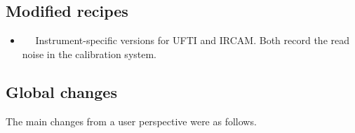 \documentclass[twoside,11pt,nolof]{starlink}
\begin{document}
\subsection{Modified recipes}

\begin{itemize}
    \item {}~~
       Instrument-specific versions for UFTI and IRCAM.  Both record the
       read noise in the calibration system.
\end{itemize}

\subsection{Global changes}

The main changes from a user perspective were as follows.
\end{document}
